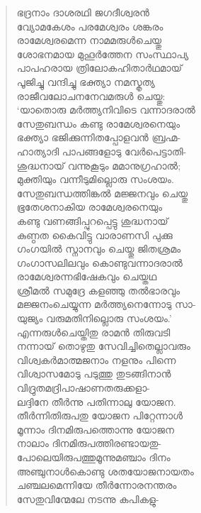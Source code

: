 \begin{verse}
ഭദ്രനാം ദാശരഥി ജഗദീശ്വരന്‍\\
വ്യോമകേശം പരമേശ്വരം ശങ്കരം\\
രാമേശ്വരമെന്ന നാമമരുള്‍ചെയ്തു\\
ശോഭനമായ മുഹൂര്‍ത്തേന സംസ്ഥാപ്യ\\
പാപഹരായ ത്രിലോകഹിതാര്‍ഥമായ്\\
പൂജിച്ചു വന്ദിച്ചു ഭക്ത്യാ നമസ്കൃത്യ\\
രാജീവലോചനനേവമരുള്‍ ചെയ്തു:\\
‘യാതൊരു മര്‍ത്ത്യനിവിടെ വന്നാദരാല്‍\\
സേതുബന്ധം കണ്ടു രാമേശ്വരനെയും\\
ഭക്ത്യാ ഭജിക്കുന്നിതപ്പോളവന്‍ ബ്രഹ്മ-\\
ഹാത്യാദി പാപങ്ങളോടു വേര്‍പെട്ടാതി-\\
ശുദ്ധനായ് വന്നുകൂടും മമാനുഗ്രഹാല്‍;\\
മുക്തിയും വന്നീടുമില്ലൊരു സംശയം.\\
സേതുബന്ധത്തിങ്കല്‍ മജ്ജനവും ചെയ്തു\\
ഭൂതേശനാകിയ രാമേശ്വരനെയും\\
കണ്ടു വണങ്ങിപ്പുറപ്പെട്ടു ശുദ്ധനായ്\\
കുണ്ഠത കൈവിട്ടു വാരാണസി പുക്കു\\
ഗംഗയില്‍ സ്നാനവും ചെയ്തു ജിതശ്രമം\\
ഗംഗാസലിലവും കൊണ്ടുവന്നാദരാല്‍\\
രാമേശ്വരന്നഭിഷേകവും ചെയ്തഥ\\
ശ്രീമല്‍ സമുദ്രേ കളഞ്ഞു തല്‍ഭാരവും\\
മജ്ജനംചെയ്യുന്ന മര്‍ത്ത്യനെന്നോടു സാ-\\
യുജ്യം വരുമതിനില്ലൊരു സംശയം.’\\
എന്നരുള്‍ചെയ്തിതു രാമന്‍ തിരുവടി\\
നന്നായ് തൊഴുതു സേവിച്ചിതെല്ലാവരും\\
വിശ്വകര്‍മാത്മജനാം നളനും പിന്നെ\\
വിശ്വാസമോടു പടുത്തു തുടങ്ങിനാന്‍\\
വിദ്രുതമദ്രിപാഷാണതരുക്കളാ-\\
ലദ്ദിനേ തീര്‍ന്നു പതിന്നാലു യോജന.\\
തീര്‍ന്നിതിരുപതു യോജന പിറ്റേന്നാള്‍\\
മൂന്നാം ദിനമിരുപത്തൊന്നു യോജന\\
നാലാം ദിനമിരുപത്തിരണ്ടായതു-\\
പോലെയിരുപത്തുമൂന്നുമഞ്ചാം ദിനം\\
അഞ്ചുനാള്‍കൊണ്ടു ശതയോജനായതം\\
ചഞ്ചലമെന്നിയേ തീര്‍ന്നോരനന്തരം\\
സേതുവിന്മേലേ നടന്നു കപികളു-\\

\end{verse}
